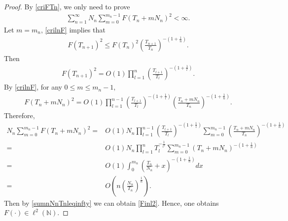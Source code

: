 \documentclass[12pt]{amsart}
\theoremstyle{plain}
\newtheorem{lemma}[theorem]{Lemma}
\theoremstyle{definition}
\begin{document}
\begin{proof}
By \eqref{criFTn}, we only need to prove 
\begin{align}
\sum_{n=1}^{\infty}N_n\sum_{m=0}^{m_n-1}F(T_n+mN_n)^2<\infty.\label{Finl2}
\end{align}
	Let $m={m}_{n}$, \eqref{crilnF} implies that
\begin{align}
F(T_{n+1})^2\leq F(T_n)^2\left(\frac{T_{n+1}}{T_n}\right)^{-\left(1+\frac{1}{n}\right)}.\nonumber
\end{align}
Then
\begin{align}
F(T_{n+1})^2=O(1)\prod_{l=1}^n\left(\frac{T_{l+1}}{T_l}\right)^{-(1+\frac{1}{l})}.\nonumber
\end{align}
By \eqref{crilnF}, for any $0\leq m \leq m_n-1$, 
\begin{align}
F(T_n+mN_n)^2=O(1)\prod_{l=1}^{n-1}\left(\frac{T_{l+1}}{T_l}\right)^{-\left(1+\frac{1}{l}\right)}\left(\frac{T_n+mN_n}{T_n}\right)^{-\left(1+\frac{1}{n}\right)}.\nonumber
\end{align}
Therefore, 
\begin{align}
			N_n\sum_{m=0}^{{m}_{n}-1}{F}({T}_{n}+mN_n)^2= &O(1)N_n\prod_{l=1}^{n-1}\left(\frac{{T}_{l+1}}{{T}_l}\right)^{-(1+\frac{1}{l})}\sum_{m=0}^{{m}_{n}-1}\left(\frac{{T}_{n}+{m}{N_n}}{{T}_{n}}\right)^{-\left(1+\frac{1}{n}\right)}\nonumber\\
			=&O(1)N_n\prod_{l=1}^{n}{T}_l^{-\frac{1}{l^2}}\sum_{m=0}^{{m}_{n}-1}\left({{T}_{n}+{m}{N_n}}\right)^{-\left(1+\frac{1}{n}\right)}\nonumber\\
			=&O(1)\int_{0}^{{m}_{n}}\left(\frac{{T}_{n}}{{N_n}}+x\right)^{-(1+\frac{1}{n})}dx\nonumber\\
			=&O\left(n\left(\frac{N_n}{T_n}\right)^{\frac{1}{n}}\right).\nonumber
		\end{align}
Then by \eqref{sumnNnTnleqinfty} we can obtain \eqref{Finl2}. Hence, one obtains $F(\cdot)\in \ell^2(\mathbb{N})$.
\end{proof}
\end{document}
